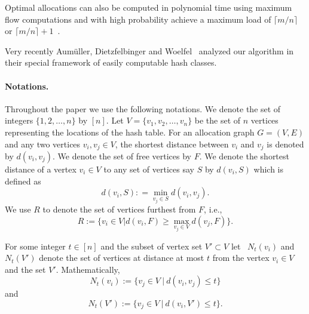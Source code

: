 \noindent Optimal allocations can also
be computed in polynomial time using maximum 
flow computations and with high probability achieve a maximum load of 
$\lceil m/n\rceil$ or $\lceil m/n\rceil +1$~\cite{sek99}. 

Very recently Aum{\"u}ller, Dietzfelbinger and Woelfel~\cite{art:aumuller16} analyzed our algorithm in their special framework of easily computable hash classes.

\paragraph{Notations.} Throughout the paper we use the following notations. We denote the set of integers $\{1,2,\ldots, n\}$ by $[n]$. Let $V=\{v_1,v_2,\ldots, v_n\}$ be the set of $n$ vertices representing the locations of the hash table. For an allocation graph $G=(V,E)$ and any two vertices $v_i,v_j\in V$, the shortest distance between $v_i$ and $v_j$ is denoted by $d(v_i,v_j).$  We denote the set of free vertices by $F$. We denote the shortest distance of a vertex $v_i\in V$ to any set of vertices say $S$ by $d(v_i,S)$ which is defined as \[d(v_i,S): = \min_{v_j\in S} d(v_i,v_j).\] We use $R$ to denote the set of vertices furthest from $F$, i.e.,
\[   R:= \{ v_i\in V |d(v_i, F ) \ge \max_{ v_j \in V} d(v_j,F)\}.
\]

For some integer $t\in[n]$ and the subset of vertex set $V' \subset V$ let ~$N_{t}(v_i)$ and $N_{t}(V')$ denote the set of vertices at distance at most $t$ from the vertex $v_i \in V$ and the set $V'$. Mathematically,
\[ N_{t}(v_i) := \{ v_j \in V~| ~d(v_i,v_j) \le t  \} \]
and 
\[ N_{t}(V') := \{ v_j \in V~| ~d(v_i,V') \le t  \} .\]
